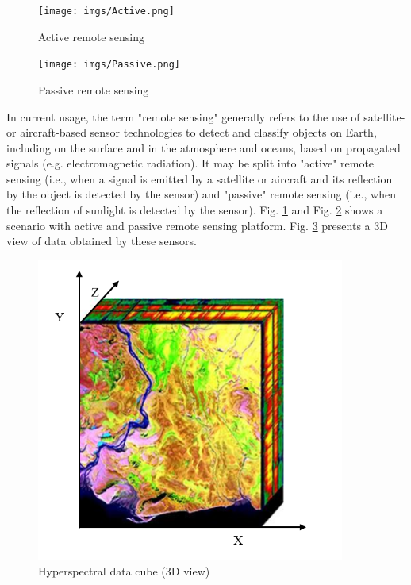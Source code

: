 \documentclass[document.tex]{subfiles}
\begin{document}
\begin{figure}[H]
	\begin{center}
		\texttt{[image: imgs/Active.png]}
	\end{center}
	\caption{Active remote sensing\cite{32}}
	\label{fig: Active remote sensing}
\end{figure}
\vline
\begin{figure}[H]
	\begin{center}
		\texttt{[image: imgs/Passive.png]}
	\end{center}
	\caption{Passive remote sensing\cite{32}}
	\label{fig: Passive remote sensing}
\end{figure}

\noindent In current usage, the term "remote sensing" generally refers to the use of satellite- or aircraft-based sensor technologies to detect and classify objects on Earth, including on the surface and in the atmosphere and oceans, based on propagated signals (e.g. electromagnetic radiation). It may be split into "active" remote sensing (i.e., when a signal is emitted by a satellite or aircraft and its reflection by the object is detected by the sensor) and "passive" remote sensing (i.e., when the reflection of sunlight is detected by the sensor). Fig. \ref{fig: Active remote sensing} and Fig. \ref{fig: Passive remote sensing} shows a scenario with active and passive remote sensing platform. Fig. \ref{fig: Hyperspectral cube} presents a 3D view of data obtained by these sensors.
\begin{figure}[H]
	\begin{center}
		\includegraphics[height=10.0cm]{imgs/cube.png}
	\end{center}
	\caption{Hyperspectral data cube (3D view)\cite{31}}
	\label{fig: Hyperspectral cube}
\end{figure}
\end{document}
